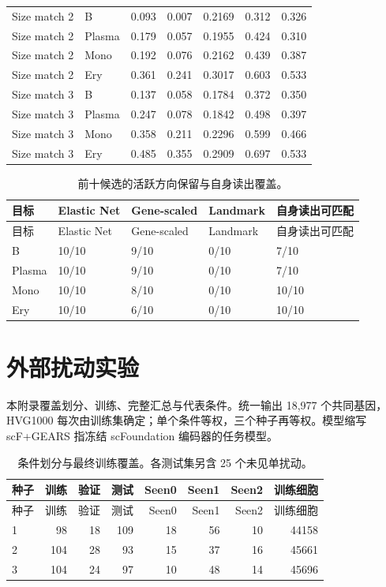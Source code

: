 {\begin{longtable}{llrrrrr}
Size match 2 & B & 0.093 & 0.007 & 0.2169 & 0.312 & 0.326\\
Size match 2 & Plasma & 0.179 & 0.057 & 0.1955 & 0.424 & 0.310\\
Size match 2 & Mono & 0.192 & 0.076 & 0.2162 & 0.439 & 0.387\\
Size match 2 & Ery & 0.361 & 0.241 & 0.3017 & 0.603 & 0.533\\
Size match 3 & B & 0.137 & 0.058 & 0.1784 & 0.372 & 0.350\\
Size match 3 & Plasma & 0.247 & 0.078 & 0.1842 & 0.498 & 0.397\\
Size match 3 & Mono & 0.358 & 0.211 & 0.2296 & 0.599 & 0.466\\
Size match 3 & Ery & 0.485 & 0.355 & 0.2909 & 0.697 & 0.533\\
\bottomrule\end{longtable}}
{\footnotesize\linespread{1}\selectfont\setlength{\tabcolsep}{4pt}\renewcommand{\arraystretch}{1.08}\begin{longtable}{lllll}\caption{前十候选的活跃方向保留与自身读出覆盖。}\\\toprule 目标 & Elastic Net & Gene-scaled & Landmark & 自身读出可匹配\\\midrule\endfirsthead\toprule 目标 & Elastic Net & Gene-scaled & Landmark & 自身读出可匹配\\\midrule\endhead
B & 10/10 & 9/10 & 0/10 & 7/10\\
Plasma & 10/10 & 9/10 & 0/10 & 7/10\\
Mono & 10/10 & 8/10 & 0/10 & 10/10\\
Ery & 10/10 & 6/10 & 0/10 & 10/10\\
\bottomrule\end{longtable}}
\clearpage\section{外部扰动实验}\label{app:D}\setcounter{figure}{0}\setcounter{table}{0}
本附录覆盖划分、训练、完整汇总与代表条件。统一输出 18,977 个共同基因，HVG1000 每次由训练集确定；单个条件等权，三个种子再等权。模型缩写 scF+GEARS 指冻结 scFoundation 编码器的任务模型。
{\small\linespread{1}\selectfont\setlength{\tabcolsep}{4pt}\renewcommand{\arraystretch}{1.08}\begin{longtable}{lrrrrrrr}\caption{条件划分与最终训练覆盖。各测试集另含 25 个未见单扰动。}\\\toprule 种子 & 训练 & 验证 & 测试 & Seen0 & Seen1 & Seen2 & 训练细胞\\\midrule\endfirsthead\toprule 种子 & 训练 & 验证 & 测试 & Seen0 & Seen1 & Seen2 & 训练细胞\\\midrule\endhead
1 & 98 & 18 & 109 & 18 & 56 & 10 & 44158\\
2 & 104 & 28 & 93 & 15 & 37 & 16 & 45661\\
3 & 104 & 24 & 97 & 10 & 48 & 14 & 45696\\
\bottomrule\end{longtable}}

